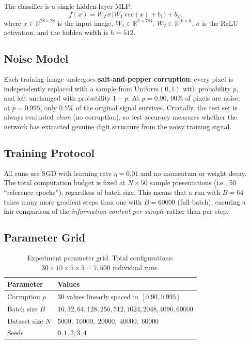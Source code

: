 \documentclass[11pt,a4paper]{article}
\begin{document}
The classifier is a single-hidden-layer MLP:
\[
  f(x) = W_2 \,\sigma\!\bigl(W_1 \,\mathrm{vec}(x) + b_1\bigr) + b_2,
\]
where $x \in \mathbb{R}^{28\times28}$ is the input image, $W_1 \in \mathbb{R}^{h \times 784}$, $W_2 \in \mathbb{R}^{10 \times h}$, $\sigma$ is the ReLU activation, and the hidden width is $h = 512$.

\subsection{Noise Model}

Each training image undergoes \textbf{salt-and-pepper corruption}: every pixel is independently replaced with a sample from $\mathrm{Uniform}(0,1)$ with probability $p$, and left unchanged with probability $1 - p$.
At $p = 0.90$, $90\%$ of pixels are noise; at $p = 0.995$, only $0.5\%$ of the original signal survives.
Crucially, the test set is always evaluated \emph{clean} (no corruption), so test accuracy measures whether the network has extracted genuine digit structure from the noisy training signal.

\subsection{Training Protocol}

All runs use SGD with learning rate $\eta = 0.01$ and no momentum or weight decay.
The total computation budget is fixed at $N \times 50$ sample presentations (i.e., 50 ``reference epochs''), regardless of batch size.
This means that a run with $B = 64$ takes many more gradient steps than one with $B = 60000$ (full-batch), ensuring a fair comparison of the \emph{information content per sample} rather than per step.

\subsection{Parameter Grid}

\begin{table}[h]
\centering
\begin{tabular}{ll}
\toprule
\textbf{Parameter} & \textbf{Values} \\
\midrule
Corruption $p$ & 30 values linearly spaced in $[0.90, 0.995]$ \\
Batch size $B$ & $16, 32, 64, 128, 256, 512, 1024, 2048, 4096, 60000$ \\
Dataset size $N$ & $5000,\; 10000,\; 20000,\; 40000,\; 60000$ \\
Seeds & $0, 1, 2, 3, 4$ \\
\bottomrule
\end{tabular}
\caption{Experiment parameter grid. Total configurations: $30 \times 10 \times 5 \times 5 = 7{,}500$ individual runs.}
\label{tab:params}
\end{table}
\end{document}
